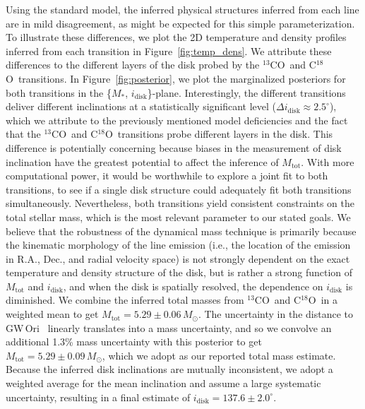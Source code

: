 \documentclass[twocolumn]{aastex61}
\newcommand{\gw}{GW\,Ori}
\newcommand{\thirteen}{${}^{13}$CO}
\newcommand{\eighteen}{C${}^{18}$O}
\begin{document}
Using the standard model, the inferred physical structures inferred from each line are in mild disagreement, as might be expected for this simple parameterization. To illustrate these differences, we plot the 2D temperature and density profiles inferred from each transition in Figure~\ref{fig:temp_dens}. We attribute these differences to the different layers of the disk probed by the \thirteen\ and \eighteen\ transitions. In Figure~\ref{fig:posterior}, we plot the marginalized posteriors for both transitions in the \{$M_\ast$, $i_\mathrm{disk}$\}-plane. Interestingly, the different transitions deliver different inclinations at a statistically significant level ($\Delta i_\mathrm{disk} \approx 2.5^\circ$), which we attribute to the previously mentioned model deficiencies and the fact that the \thirteen\ and \eighteen\ transitions probe different layers in the disk.
This difference is potentially concerning because biases in the measurement of disk inclination have the greatest potential to affect the inference of $M_\mathrm{tot}$. With more computational power, it would be worthwhile to explore a joint fit to both transitions, to see if a single disk structure could adequately fit both transitions simultaneously.
Nevertheless, both transitions yield consistent constraints on the total stellar mass, which is the most relevant parameter to our stated goals. We believe that the robustness of the dynamical mass technique is primarily because the kinematic morphology of the line emission (i.e., the location of the emission in R.A., Dec., and radial velocity space) is not strongly dependent on the exact temperature and density structure of the disk, but is rather a strong function of $M_\mathrm{tot}$ and $i_\mathrm{disk}$, and when the disk is spatially resolved, the dependence on $i_\mathrm{disk}$ is diminished. We combine the inferred total masses from \thirteen\ and \eighteen\ in a weighted mean to get $M_\mathrm{tot} = 5.29 \pm 0.06\,M_\odot$.
The uncertainty in the distance to \gw\ \citep[$388 \pm 5\,$pc;][]{kounkel17} linearly translates into a mass uncertainty, and so we convolve an additional 1.3\% mass uncertainty with this posterior to get  $M_\mathrm{tot} = 5.29 \pm 0.09\,M_\odot$, which we adopt as our reported total mass estimate. Because the inferred disk inclinations are mutually inconsistent, we adopt a weighted average for the mean inclination and assume a large systematic uncertainty, resulting in a final estimate of $i_\mathrm{disk} = 137.6 \pm 2.0^\circ$.
\end{document}
